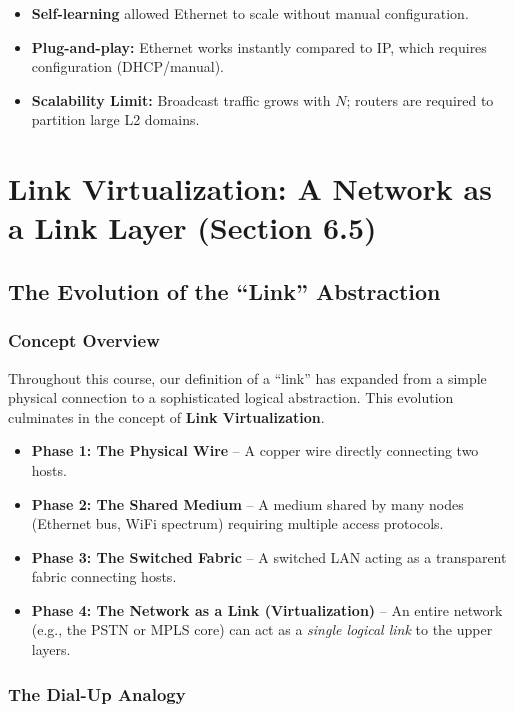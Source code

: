 \documentclass[12pt]{article}
\begin{document}
\begin{itemize}
    \item \textbf{Self-learning} allowed Ethernet to scale without manual configuration.
    \item \textbf{Plug-and-play:} Ethernet works instantly compared to IP, which requires configuration (DHCP/manual).
    \item \textbf{Scalability Limit:} Broadcast traffic grows with $N$; routers are required to partition large L2 domains.
\end{itemize}


\section{Link Virtualization: A Network as a Link Layer (Section 6.5)}

\subsection{The Evolution of the ``Link'' Abstraction}

\subsubsection{Concept Overview}

Throughout this course, our definition of a ``link'' has expanded from a simple physical connection to a sophisticated logical abstraction. This evolution culminates in the concept of \textbf{Link Virtualization}.

\begin{itemize}
    \item \textbf{Phase 1: The Physical Wire} – A copper wire directly connecting two hosts.
    \item \textbf{Phase 2: The Shared Medium} – A medium shared by many nodes (Ethernet bus, WiFi spectrum) requiring multiple access protocols.
    \item \textbf{Phase 3: The Switched Fabric} – A switched LAN acting as a transparent fabric connecting hosts.
    \item \textbf{Phase 4: The Network as a Link (Virtualization)} – An entire network (e.g., the PSTN or MPLS core) can act as a \emph{single logical link} to the upper layers.
\end{itemize}

\subsubsection{The Dial-Up Analogy}
\end{document}
